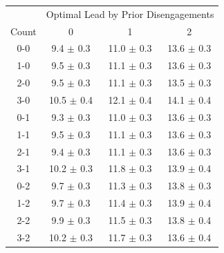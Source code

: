 \begin{tabular}{c|ccc}
& \multicolumn{3}{c}{Optimal Lead by Prior Disengagements}\\
Count & 0 & 1 & 2 \\
  \hline
0-0 & 9.4 {\color{gray}$\pm$ 0.3} & 11.0 {\color{gray}$\pm$ 0.3} & 13.6 {\color{gray}$\pm$ 0.3} \\ 
  1-0 & 9.5 {\color{gray}$\pm$ 0.3} & 11.1 {\color{gray}$\pm$ 0.3} & 13.6 {\color{gray}$\pm$ 0.3} \\ 
  2-0 & 9.5 {\color{gray}$\pm$ 0.3} & 11.1 {\color{gray}$\pm$ 0.3} & 13.5 {\color{gray}$\pm$ 0.3} \\ 
  3-0 & 10.5 {\color{gray}$\pm$ 0.4} & 12.1 {\color{gray}$\pm$ 0.4} & 14.1 {\color{gray}$\pm$ 0.4} \\ 
   \hline
0-1 & 9.3 {\color{gray}$\pm$ 0.3} & 11.0 {\color{gray}$\pm$ 0.3} & 13.6 {\color{gray}$\pm$ 0.3} \\ 
  1-1 & 9.5 {\color{gray}$\pm$ 0.3} & 11.1 {\color{gray}$\pm$ 0.3} & 13.6 {\color{gray}$\pm$ 0.3} \\ 
  2-1 & 9.4 {\color{gray}$\pm$ 0.3} & 11.1 {\color{gray}$\pm$ 0.3} & 13.6 {\color{gray}$\pm$ 0.3} \\ 
  3-1 & 10.2 {\color{gray}$\pm$ 0.3} & 11.8 {\color{gray}$\pm$ 0.3} & 13.9 {\color{gray}$\pm$ 0.4} \\ 
   \hline
0-2 & 9.7 {\color{gray}$\pm$ 0.3} & 11.3 {\color{gray}$\pm$ 0.3} & 13.8 {\color{gray}$\pm$ 0.3} \\ 
  1-2 & 9.7 {\color{gray}$\pm$ 0.3} & 11.4 {\color{gray}$\pm$ 0.3} & 13.9 {\color{gray}$\pm$ 0.4} \\ 
  2-2 & 9.9 {\color{gray}$\pm$ 0.3} & 11.5 {\color{gray}$\pm$ 0.3} & 13.8 {\color{gray}$\pm$ 0.4} \\ 
  3-2 & 10.2 {\color{gray}$\pm$ 0.3} & 11.7 {\color{gray}$\pm$ 0.3} & 13.6 {\color{gray}$\pm$ 0.4} \\ 
\end{tabular}
